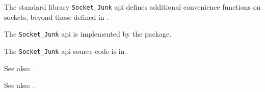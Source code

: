 
The standard library {\tt Socket\_Junk} api defines additional convenience functions on sockets, beyond those defined in  .

The {\tt Socket\_Junk} api is implemented by the  package.

The {\tt Socket\_Junk} api source code is in .

See also: .

See also: .




